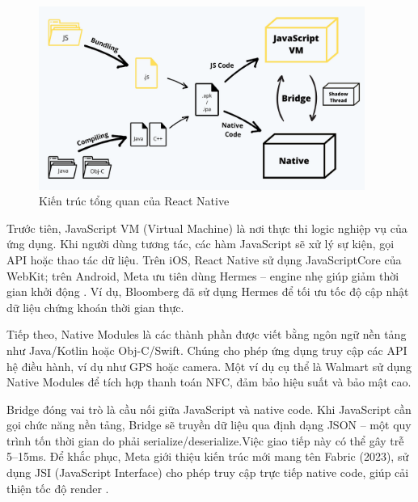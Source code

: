 \begin{figure}[H]
    \centering
    \includegraphics[width=0.95\textwidth]{images/react_native.png}
    \caption{Kiến trúc tổng quan của React Native~\cite{anshulreactnative}}
\end{figure}

\begin{sloppypar}
Trước tiên, JavaScript VM (Virtual Machine) là nơi thực thi logic nghiệp vụ của ứng dụng.  
Khi người dùng tương tác, các hàm JavaScript sẽ xử lý sự kiện, gọi API hoặc thao tác dữ liệu.  
Trên iOS, React Native sử dụng JavaScriptCore của WebKit; trên Android, Meta ưu tiên dùng Hermes – engine nhẹ giúp giảm thời gian khởi động \cite{reactnativehermes}.  
Ví dụ, Bloomberg đã sử dụng Hermes để tối ưu tốc độ cập nhật dữ liệu chứng khoán thời gian thực.
\end{sloppypar}

\vspace{0.5em}

\begin{sloppypar}
Tiếp theo, Native Modules là các thành phần được viết bằng ngôn ngữ nền tảng như Java/Kotlin hoặc Obj-C/Swift.  
Chúng cho phép ứng dụng truy cập các API hệ điều hành, ví dụ như GPS hoặc camera.  
Một ví dụ cụ thể là Walmart sử dụng Native Modules để tích hợp thanh toán NFC, đảm bảo hiệu suất và bảo mật cao.
\end{sloppypar}

\vspace{0.5em}

\begin{sloppypar}
Bridge đóng vai trò là cầu nối giữa JavaScript và native code.  
Khi JavaScript cần gọi chức năng nền tảng, Bridge sẽ truyền dữ liệu qua định dạng JSON – một quy trình tốn thời gian do phải serialize/\-deserialize.Việc giao tiếp này có thể gây trễ 5–15ms. Để khắc phục, Meta giới thiệu kiến trúc mới mang tên Fabric (2023), sử dụng JSI (JavaScript\- Interface) cho phép truy cập trực tiếp native code, giúp cải thiện tốc độ render \cite{viblofabric}.
\end{sloppypar}

